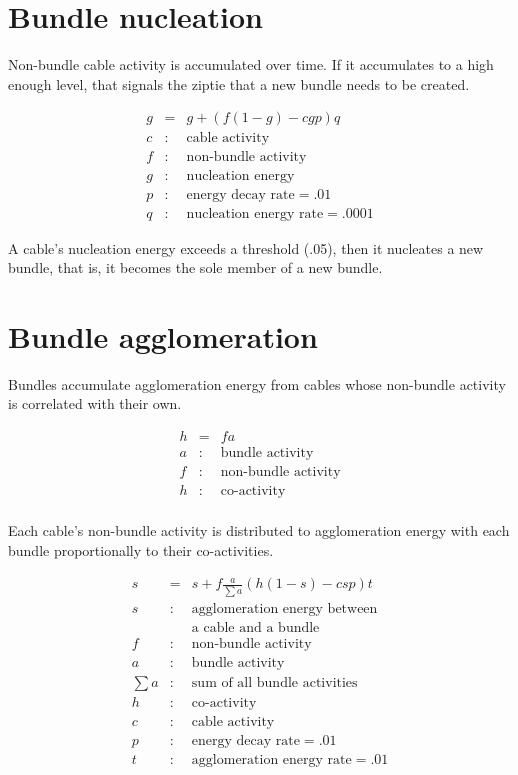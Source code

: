 \documentclass[oneside,twocolumn]{article}
\begin{document}
\section*{\color{copper} Bundle nucleation}

Non-bundle cable activity is accumulated over time. If it accumulates to a high enough level, that signals the ziptie that a new bundle needs to be created.

\begin{eqnarray*}
g &=& g + (f  (1 - g)  - c  g  p )  q\\ 
c &:& \mbox{cable activity}\\
f &:& \mbox{non-bundle activity}\\
g &:& \mbox{nucleation energy}\\
p &:& \mbox{energy decay rate} = .01\\
q &:& \mbox{nucleation energy rate} = .0001
\end{eqnarray*}

A cable's nucleation energy exceeds a threshold (.05),  then it nucleates a new bundle, that is, it becomes the sole member of a new bundle.
          
\section*{\color{copper} Bundle agglomeration}

Bundles accumulate agglomeration energy from cables whose non-bundle activity is correlated with their own. 

\begin{eqnarray*}
h &=& fa\\ 
a &:& \mbox{bundle activity}\\
f &:& \mbox{non-bundle activity}\\
h &:& \mbox{co-activity}\\
\end{eqnarray*}

Each cable's non-bundle activity is distributed to agglomeration energy with each bundle proportionally to their co-activities.

\begin{eqnarray*}
s &=& s + f  \frac{a}{\sum a} (h (1-s) - c s p) t\\ 
s &:& \mbox{agglomeration energy between}\\
&& \mbox{a cable and a bundle}\\
f &:& \mbox{non-bundle activity}\\
a &:& \mbox{bundle activity}\\
\sum a &:& \mbox{sum of all bundle activities}\\
h &:& \mbox{co-activity}\\
c &:& \mbox{cable activity}\\
p &:& \mbox{energy decay rate} = .01\\
t &:& \mbox{agglomeration energy rate} = .01\\
\end{eqnarray*}
                                      
\end{document}
